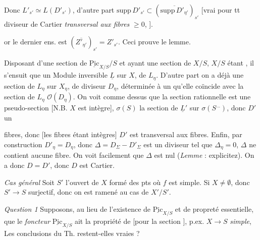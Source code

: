 \documentclass[11pt,a4paper]{article}
\begin{document}

Donc \ill{} $L'_{s'}\simeq L(D'_{s'})$, d'autre part
$\mathrm{supp}\,D'_{s'}\subset(\overline{\mathrm{supp}\,D'_{\eta'}})_{s'}$ \struck{\ill{}}
[vrai pour tt diviseur de Cartier \emph{transversal aux fibres} \ill{}
  \ill{} \ill{} $\geq 0$, \ill{} \ill{}].

or le dernier ens. est $(\overline{Z'_{\eta'}})_{s'}=Z'_{s'}$. Ceci prouve le lemme.

Disposant d'une section de $\underline{\mathrm{Pic}}_{X/S}/S$ et ayant une section de
$X/S$, $X/S$ étant  \ill{}, il s'ensuit que \ill{} \ill{} un
Module inversible $\underline{L}$ sur $X$, de \ill{}  $L_\eta$. D'autre
part on a déjà \struck{\ill{}} une section de $L_\eta$ sur $X_\eta$, de diviseur $D_\eta$,
déterminée à un  \ill{} \ill{} qu'elle coïncide avec la section
 de $L_\eta$ \ill{} \ill{} $\mathcal{O}(D_\eta)$. On voit comme
dessus que la section \struck{\ill{}} rationnelle est une pseudo-section  [N.B. $X$ est intègre],  \ill{} $\sigma(S)$ \struck{\ill{}} \ill{} \ill{} la section \ill{} de
$\underline{L}'$ sur $\sigma(S^{\ldots})$, donc \struck{\ill{}} \ill{} $D'$ un \ill{}
\ill{}


fibres, donc [les fibres étant intègres] $D'$ est transversal aux fibres. Enfin,
\struck{\ill{}}  par construction $D'_\eta=D_\eta$, donc
$\Delta=D_\Sigma-D'_\Sigma$ est un diviseur tel que $\Delta_\eta=0$, \ill{} $\Delta$ ne
contient aucune fibre. On voit facilement que \ill{} $\Delta$ est nul (\emph{Lemme} :
explicitez). On a donc $D=D'$, donc $D$ est Cartier.

\emph{Cas général} Soit $S'$ l'ouvert de $X$ formé des pts où $f$ est simple.
 Si $X\neq\emptyset$, donc $S'\to S$ surjectif, donc on est ramené au cas
de $X'/S'$.

\emph{Question 1} Supposons, au lieu de l'existence de $\underline{\mathrm{Pic}}_{X/S}$ et de
propreté essentielle, que le \emph{foncteur} $\underline{\mathrm{Pic}}_{X/S}$ ait la
propriété de \struck{\ill{}}  [pour la section
], p.ex. $X\to S$ \emph{simple},   Les conclusions du Th. restent-elles vraies ?
\end{document}
